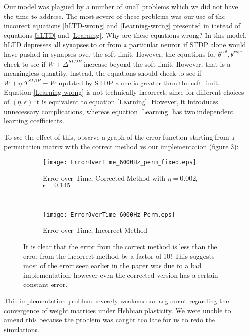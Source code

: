 Our model was plagued by a number of small problems which we did not have the time to address. The most severe of these problems was our use of the incorrect equations \eqref{hLTD-wrong} and \eqref{Learning-wrong} presented in \cite{Fiete} instead of equations \eqref{hLTD} and \eqref{Learning}. Why are these equations wrong? In this model, hLTD depresses all synapses to or from a particular neuron if STDP alone would have pushed in synapses over the soft limit. However, the equations for \(\theta^{col},\theta^{row}\) check to see if \(W + \Delta^{STDP}\) increase beyond the soft limit. However, that is a meaningless quantity. Instead, the equations should check to see if \(W + \eta\Delta^{STDP} = W\) updated by STDP alone is greater than the soft limit. Equation \eqref{Learning-wrong} is not technically incorrect, since for different choices of \((\eta,\epsilon)\) it is equivalent to equation \eqref{Learning}. However, it introduces unnecessary complications, whereas equation \eqref{Learning} has two independent learning coefficients.

To see the effect of this, observe a graph of the error function starting from a permutation matrix with the correct method vs our implementation (figure \ref{EoT}):

\begin{figure}[H]
\centering
\begin{subfigure}[b]{0.49\textwidth}
\texttt{[image: ErrorOverTime\_6000Hz\_perm\_fixed.eps]}
\caption{Error over Time, Corrected Method with \(\eta = 0.002\), \(\epsilon = 0.145\)}
\label{EoT: fixed}
\end{subfigure}
\,
\begin{subfigure}[b]{0.49\textwidth}
\texttt{[image: ErrorOverTime\_6000Hz\_Perm.eps]}
\caption{Error over Time, Incorrect Method}
\label{EoT: broken}
\end{subfigure}
\caption{It is clear that the error from the correct method is less than the error from the incorrect method by a factor of 10! This suggests most of the error seen earlier in the paper was due to a bad implementation, however even the corrected version has a certain constant error.}
\label{EoT}
\end{figure}

This implementation problem severely weakens our argument regarding the convergence of weight matrices under Hebbian plasticity. We were unable to amend this because the problem was caught too late for us to redo the simulations. 

